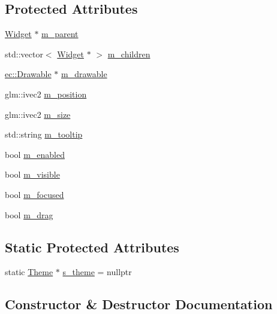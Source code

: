 \subsection*{Protected Attributes}
\begin{DoxyCompactItemize}
\item 
\mbox{\hyperlink{classngl__gui_1_1_widget}{Widget}} $\ast$ \mbox{\hyperlink{classngl__gui_1_1_widget_a09ffb9283908093bcef73ba9fc2061a4}{m\+\_\+parent}}
\item 
std\+::vector$<$ \mbox{\hyperlink{classngl__gui_1_1_widget}{Widget}} $\ast$ $>$ \mbox{\hyperlink{classngl__gui_1_1_widget_ac841b8e18f17432767be5711e38999f0}{m\+\_\+children}}
\item 
\mbox{\hyperlink{classec_1_1_drawable}{ec\+::\+Drawable}} $\ast$ \mbox{\hyperlink{classngl__gui_1_1_widget_af12a3b7766959c8753dcd6c46116a81c}{m\+\_\+drawable}}
\item 
glm\+::ivec2 \mbox{\hyperlink{classngl__gui_1_1_widget_a70faaab294ca368962d5841de2669f1d}{m\+\_\+position}}
\item 
glm\+::ivec2 \mbox{\hyperlink{classngl__gui_1_1_widget_a3ccc83d7b5e7df098f85a484088fae7e}{m\+\_\+size}}
\item 
std\+::string \mbox{\hyperlink{classngl__gui_1_1_widget_a547515f4345391f1ae1c0fecc1354806}{m\+\_\+tooltip}}
\item 
bool \mbox{\hyperlink{classngl__gui_1_1_widget_a3604b9c01a61aa3fe8883ee04b848c6c}{m\+\_\+enabled}}
\item 
bool \mbox{\hyperlink{classngl__gui_1_1_widget_a61c829e05729c4eb38f5f1db7c59d2fa}{m\+\_\+visible}}
\item 
bool \mbox{\hyperlink{classngl__gui_1_1_widget_a6c71f5f5617b9974fbc4a871adb60edb}{m\+\_\+focused}}
\item 
bool \mbox{\hyperlink{classngl__gui_1_1_widget_ad5fbd226a8dc5df1cd38f3392950c37d}{m\+\_\+drag}}
\end{DoxyCompactItemize}
\subsection*{Static Protected Attributes}
\begin{DoxyCompactItemize}
\item 
static \mbox{\hyperlink{classngl__gui_1_1_theme}{Theme}} $\ast$ \mbox{\hyperlink{classngl__gui_1_1_widget_a3def3b84db75a90cf5462c87bd687cc9}{s\+\_\+theme}} = nullptr
\end{DoxyCompactItemize}


\subsection{Constructor \& Destructor Documentation}
\mbox{\label{classngl__gui_1_1_widget_a6c94eedacd5b5be0fd989d31f07e75fe}} 
